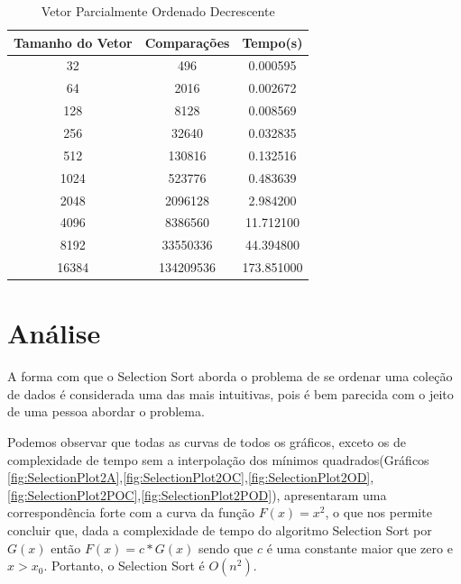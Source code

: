 \documentclass[12pt,a4paper,twoside]{report}
\begin{document}
\begin{table}[h]
  \centering
  \caption{Vetor Parcialmente Ordenado Decrescente \label{tab:pod}}
  \begin{tabular}{ccc} \\\hline
  \textbf{Tamanho do Vetor} & \textbf{Comparações} & \textbf{Tempo(s)} \\\hline
  32                        & 496                  & 0.000595          \\\hline
  64                        & 2016                 & 0.002672          \\\hline
  128                       & 8128                 & 0.008569          \\\hline
  256                       & 32640                & 0.032835          \\\hline
  512                       & 130816               & 0.132516          \\\hline
  1024                      & 523776               & 0.483639          \\\hline
  2048                      & 2096128              & 2.984200          \\\hline
  4096                      & 8386560              & 11.712100         \\\hline
  8192                      & 33550336             & 44.394800        \\\hline
  16384                     & 134209536            & 173.851000        \\\hline
  \end{tabular}
\end{table}


\chapter{Análise}

A forma com que o Selection Sort aborda o problema de se ordenar uma coleção de dados é considerada uma das mais intuitivas, pois é bem parecida com o jeito de uma pessoa abordar o problema. 

Podemos observar que todas as curvas de todos os gráficos, exceto os de complexidade de tempo sem a interpolação dos mínimos quadrados(Gráficos \ref{fig:SelectionPlot2A},\ref{fig:SelectionPlot2OC},\ref{fig:SelectionPlot2OD},\ref{fig:SelectionPlot2POC},\ref{fig:SelectionPlot2POD}), apresentaram uma correspondência forte com a curva da função $F(x) = x^2$, o que nos permite concluir que, dada a complexidade de tempo do algoritmo Selection Sort por $G(x)$ então $F(x) = c * G(x)$ sendo que $c$ é uma constante maior que zero e $x > x_0$. Portanto, o Selection Sort é $O(n^2)$.
\end{document}
